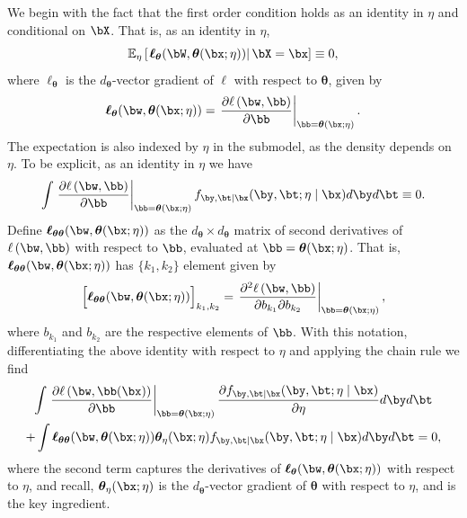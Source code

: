 \documentclass[12pt]{article}
\numberwithin{equation}{section}
\theoremstyle{definition}
\newcommand{\E}{\mathbb{E}}
\newcommand{\btheta}{\boldsymbol{\theta}}
\newcommand{\dtheta}{d_{\btheta}}  %
\begin{document}
\begin{appendices}
We begin with the fact that the first order condition holds as an identity in $\eta$ and conditional on $\bX$. That is, as an identity in $\eta$, 
\begin{equation}
	\label{appxeqn:foc}
	\E_\eta \left[ \left. \bm{\ell}_{\btheta}(\bW, \btheta(\bx;\eta))   \right\vert \bX = \bx \right] \equiv 0,
\end{equation}
where $\bm{\ell}_{\btheta}$ is the $\dtheta$-vector gradient of $\ell$ with respect to $\btheta$, given by
\[
	 \bm{\ell}_{\btheta}(\bw, \btheta(\bx;\eta)) = \left. \frac{ \partial \ell\left(\bw, \bb \right)}{\partial \bb}\right \vert_{\bb = \btheta(\bx;\eta)}.
\]
The expectation is also indexed by $\eta$ in the submodel, as the density depends on $\eta$. To be explicit, as an identity in $\eta$ we have
\[
	\int  \left. \frac{ \partial \ell\left(\bw, \bb \right)}{\partial \bb}\right \vert_{\bb = \btheta(\bx;\eta)} f_{\by,\bt | \bx}(\by, \bt ; \eta \mid \bx) d\by d\bt \equiv 0.
\]
Define $\bm{\ell}_{\btheta\btheta}(\bw, \btheta(\bx;\eta))$ as the $\dtheta \times \dtheta$ matrix of second derivatives of $\ell\left(\bw, \bb \right)$ with respect to $\bb$, evaluated at $\bb = \btheta(\bx;\eta)$. That is, $\bm{\ell}_{\btheta\btheta}(\bw, \btheta(\bx;\eta))$ has $\{k_1, k_2\}$ element given by
\[
	\Big[\bm{\ell}_{\btheta\btheta}(\bw, \btheta(\bx;\eta))\Big]_{k_1,k_2} = \left. \frac{ \partial^2 \ell\left(\bw, \bb \right)}{\partial b_{k_1}\partial b_{k_2}}\right \vert_{\bb = \btheta(\bx;\eta)},
\]
where $b_{k_1}$ and $b_{k_2}$ are the respective elements of $\bb$. With this notation, differentiating the above identity with respect to $\eta$ and applying the chain rule we find
\begin{multline*}
	\int  \left. \frac{ \partial \ell\left(\bw, \bb(\bx) \right)}{\partial \bb}\right \vert_{\bb = \btheta(\bx;\eta)} \frac{ \partial f_{\by,\bt | \bx}(\by, \bt ; \eta \mid \bx)}{\partial \eta} d\by d\bt   
	\\ 
	+    \int  \bm{\ell}_{\btheta\btheta}(\bw, \btheta(\bx;\eta)) \btheta_{\eta}(\bx ;\eta) f_{\by,\bt | \bx}(\by, \bt ; \eta \mid \bx) d\by d\bt   = 0,
\end{multline*}
where the second term captures the derivatives of $\bm{\ell}_{\btheta}(\bw, \btheta(\bx;\eta))$ with respect to $\eta$, and recall, $\btheta_{\eta}(\bx ;\eta)$ is the $\dtheta$-vector gradient of $\btheta$ with respect to $\eta$, and is the key ingredient. 




\end{appendices}
\end{document}
